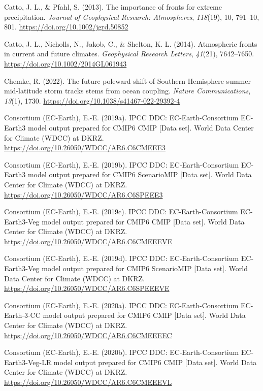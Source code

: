 \documentclass[
]{agujournal2019}
\newlength{\cslhangindent}
\newenvironment{CSLReferences}[2] %
 {\begin{list}{}{%
  \setlength{\itemindent}{0pt}
  \setlength{\leftmargin}{0pt}
  \setlength{\parsep}{0pt}
  \ifodd #1
   \setlength{\leftmargin}{\cslhangindent}
   \setlength{\itemindent}{-1\cslhangindent}
  \fi
  \setlength{\itemsep}{#2\baselineskip}}}
 {\end{list}}
\begin{document}
\begin{CSLReferences}{1}{0}
Catto, J. L., \& Pfahl, S. (2013). The importance of fronts for extreme
precipitation. \emph{Journal of Geophysical Research: Atmospheres},
\emph{118}(19), 10, 791--10, 801.
\url{https://doi.org/10.1002/jgrd.50852}

Catto, J. L., Nicholls, N., Jakob, C., \& Shelton, K. L. (2014).
Atmospheric fronts in current and future climates. \emph{Geophysical
Research Letters}, \emph{41}(21), 7642--7650.
\url{https://doi.org/10.1002/2014GL061943}

Chemke, R. (2022). The future poleward shift of {Southern Hemisphere}
summer mid-latitude storm tracks stems from ocean coupling. \emph{Nature
Communications}, \emph{13}(1), 1730.
\url{https://doi.org/10.1038/s41467-022-29392-4}

Consortium (EC-Earth), E.-E. (2019a). {IPCC DDC}: {EC-Earth-Consortium
EC-Earth3} model output prepared for {CMIP6 CMIP} {[}Data set{]}. World
Data Center for Climate (WDCC) at DKRZ.
\url{https://doi.org/10.26050/WDCC/AR6.C6CMEEE3}

Consortium (EC-Earth), E.-E. (2019b). {IPCC DDC}: {EC-Earth-Consortium
EC-Earth3} model output prepared for {CMIP6 ScenarioMIP} {[}Data set{]}.
World Data Center for Climate (WDCC) at DKRZ.
\url{https://doi.org/10.26050/WDCC/AR6.C6SPEEE3}

Consortium (EC-Earth), E.-E. (2019c). {IPCC DDC}: {EC-Earth-Consortium
EC-Earth3-Veg} model output prepared for {CMIP6 CMIP} {[}Data set{]}.
World Data Center for Climate (WDCC) at DKRZ.
\url{https://doi.org/10.26050/WDCC/AR6.C6CMEEEVE}

Consortium (EC-Earth), E.-E. (2019d). {IPCC DDC}: {EC-Earth-Consortium
EC-Earth3-Veg} model output prepared for {CMIP6 ScenarioMIP} {[}Data
set{]}. World Data Center for Climate (WDCC) at DKRZ.
\url{https://doi.org/10.26050/WDCC/AR6.C6SPEEEVE}

Consortium (EC-Earth), E.-E. (2020a). {IPCC DDC}: {EC-Earth-Consortium
EC-Earth-3-CC} model output prepared for {CMIP6 CMIP} {[}Data set{]}.
World Data Center for Climate (WDCC) at DKRZ.
\url{https://doi.org/10.26050/WDCC/AR6.C6CMEEEEC}

Consortium (EC-Earth), E.-E. (2020b). {IPCC DDC}: {EC-Earth-Consortium
EC-Earth3-Veg-LR} model output prepared for {CMIP6 CMIP} {[}Data set{]}.
World Data Center for Climate (WDCC) at DKRZ.
\url{https://doi.org/10.26050/WDCC/AR6.C6CMEEEVL}


\end{CSLReferences}
\end{document}
